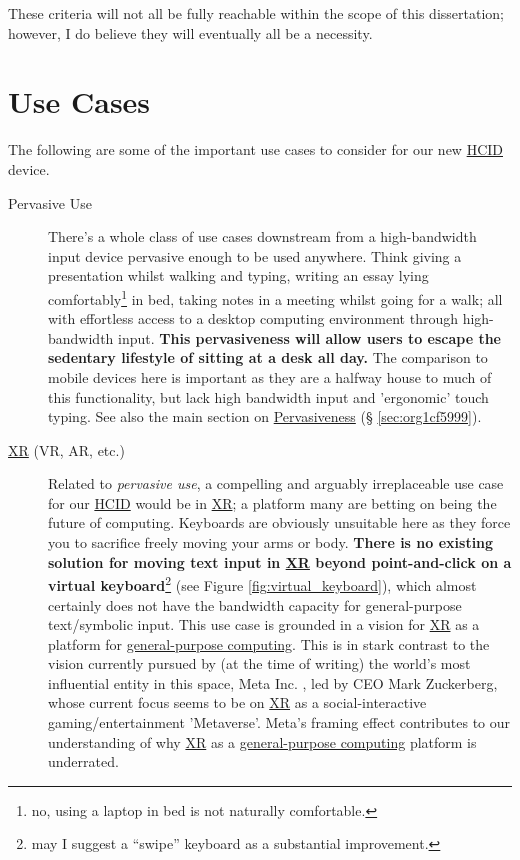 \documentclass[logo,bsc,singlespacing,parskip]{infthesis}
\begin{document}
These criteria will not all be fully reachable within the scope of this dissertation; however, I do believe they will eventually all be a necessity.

\chapter{Use Cases}
\label{sec:org2d37584}
The following are some of the important use cases to consider for our new \hyperref[org0c83164]{HCID} device.

\begin{description}
\item[{Pervasive Use}] There's a whole class of use cases downstream from a high-bandwidth input device pervasive enough to be used anywhere.
Think giving a presentation whilst walking and typing, writing an essay lying comfortably\footnote{no, using a laptop in bed is not naturally comfortable.} in bed, taking notes in a meeting whilst going for a walk; all with effortless access to a desktop computing environment through high-bandwidth input.
\textbf{This pervasiveness will allow users to escape the sedentary lifestyle of sitting at a desk all day.}
The comparison to mobile devices here is important as they are a halfway house to much of this functionality, but lack high bandwidth input and 'ergonomic' touch typing.
See also the main section on \hyperref[sec:org1cf5999]{Pervasiveness} (§ \ref{sec:org1cf5999}).

\item[{\hyperref[org39cbd51]{XR} (VR, AR, etc.)}] Related to \emph{pervasive use}, a compelling and arguably irreplaceable use case for our \hyperref[org0c83164]{HCID} would be in \hyperref[org39cbd51]{XR}; a platform many are betting on being the future of computing.
Keyboards are obviously unsuitable here as they force you to sacrifice freely moving your arms or body.
\textbf{There is no existing solution for moving text input in \hyperref[org39cbd51]{XR} beyond point-and-click on a virtual keyboard}\footnote{may I suggest a ``swipe'' keyboard as a substantial improvement.} (see Figure \ref{fig:virtual_keyboard}), which almost certainly does not have the bandwidth capacity for general-purpose text/symbolic input.
This use case is grounded in a vision for \hyperref[org39cbd51]{XR} as a platform for \hyperref[orgbaec896]{general-purpose computing}.
This is in stark contrast to the vision currently pursued by (at the time of writing) the world's most influential entity in this space, Meta Inc. \autocite{WelcomeMetaMeta}, led by CEO Mark Zuckerberg, whose current focus seems to be on \hyperref[org39cbd51]{XR} as a social-interactive gaming/entertainment 'Metaverse'.
Meta's framing effect contributes to our understanding of why \hyperref[org39cbd51]{XR} as a \hyperref[orgbaec896]{general-purpose computing} platform is underrated.


\end{description}
\end{document}
